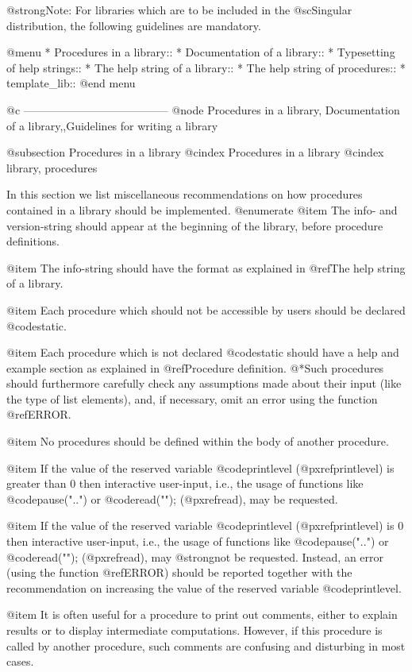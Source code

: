 {{{{@strong{Note:} For libraries which are to be included in the @sc{Singular}
distribution, the following guidelines are mandatory.

@menu
* Procedures in a library::
* Documentation of a library::
* Typesetting of help strings::
* The help string of a library::
* The help string of procedures::
* template_lib::
@end menu

@c ---------------------------------------
@node Procedures in a library, Documentation of a library,,Guidelines for writing a library

@subsection Procedures in a library
@cindex Procedures in a library
@cindex library, procedures

In this section we list miscellaneous recommendations on how procedures
contained in a library should be implemented.
@enumerate
@item
The info- and version-string should appear at the beginning of the
library, before procedure definitions.

@item
The info-string should have the format as explained in @ref{The help
string of a library}.

@item
Each procedure which should not be accessible by users should be
declared @code{static}.

@item
Each procedure which is not declared @code{static} should have a
help and example section as explained in @ref{Procedure definition}.
@*Such procedures should furthermore carefully check any assumptions
made about their input (like the type of list elements), and, if
necessary, omit an error using the  function @ref{ERROR}.

@item
No procedures should be defined within the body of another procedure.

@item
If the value of
the reserved variable @code{printlevel} (@pxref{printlevel}) is greater
than 0 then interactive user-input, i.e., the usage of functions like
@code{pause("..")} or @code{read("");} (@pxref{read}), may be requested.

@item
If the value of
the reserved variable @code{printlevel} (@pxref{printlevel}) is 0
then interactive user-input, i.e., the usage of functions like
@code{pause("..")} or @code{read("");} (@pxref{read}), may @strong{not} be
requested. Instead, an error (using the function
@ref{ERROR}) should be reported together with the recommendation on
increasing the value of the reserved variable @code{printlevel}.

@item
It is often useful for a procedure to print out comments, either to
explain results or to display intermediate computations. However,
if this procedure is called by another procedure, such comments are
confusing and disturbing in most cases.

}}}}
